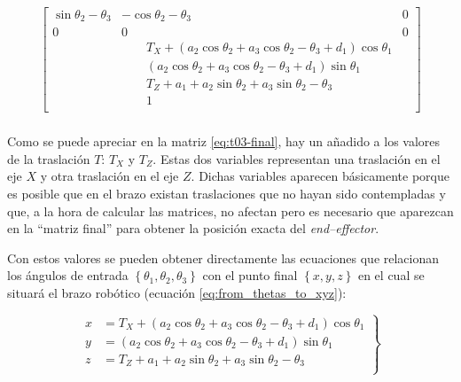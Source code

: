 \begin{align}
{\begin{bmatrix}
        \sin{\theta_{2} - \theta_{3}}                  & - \cos{\theta_{2} - \theta_{3}}                                                                                   & 0                  \\
        0                                              & 0                                                                                                                 & 0                  \\
                                                       & \qquad T_{X} + \left(a_{2} \cos{\theta_{2}} + a_{3} \cos{\theta_{2} - \theta_{3}} + d_{1}\right) \cos{\theta_{1}}                      \\
                                                       & \qquad \left(a_{2} \cos{\theta_{2}} + a_{3} \cos{\theta_{2} - \theta_{3}} + d_{1}\right) \sin{\theta_{1}}                              \\
                                                       & \qquad T_{Z} + a_{1} + a_{2} \sin{\theta_{2}} + a_{3} \sin{\theta_{2} - \theta_{3}}                                                    \\
                                                       & \qquad 1                                                                                                                               \\
    \end{bmatrix}}\label{eq:t03-final} \\[1ex]
\end{align}

Como se puede apreciar en la matriz \ref{eq:t03-final}, hay un añadido a los valores
de la traslación $T$: $T_X$ y $T_Z$. Estas dos variables representan una traslación en el
eje $X$ y otra traslación en el eje $Z$. Dichas variables aparecen básicamente
porque es posible que en el brazo existan traslaciones que no hayan sido contempladas
y que, a la hora de calcular las matrices, no afectan pero es necesario que aparezcan
en la ``matriz final'' para obtener la posición exacta del \textit{end--effector}.

Con estos valores se pueden obtener directamente las ecuaciones que relacionan
los ángulos de entrada $\left\{\theta_1, \theta_2, \theta_3\right\}$ con el punto
final $\left\{x, y, z\right\}$ en el cual se situará el brazo robótico (ecuación
\ref{eq:from_thetas_to_xyz}):

\begin{equation}
    \label{eq:from_thetas_to_xyz}
    \left.\begin{aligned}
        x &= T_{X} + \left(a_{2} \cos{\theta_{2}} + a_{3} \cos{\theta_{2} - \theta_{3}} + d_{1}\right) \cos{\theta_{1}} \\
        y &= \left(a_{2} \cos{\theta_{2}} + a_{3} \cos{\theta_{2} - \theta_{3}} + d_{1}\right) \sin{\theta_{1}} \\
        z &= T_{Z} + a_{1} + a_{2} \sin{\theta_{2}} + a_{3} \sin{\theta_{2} - \theta_{3}} \\
    \end{aligned}
    \right\}
\end{equation}

